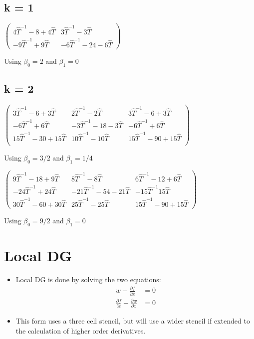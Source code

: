\documentclass[10pt,letterpaper]{article}
\begin{document}
\subsection{k = 1}
$\left(\begin{array}{cc}
4\hat{T}^{-1} -8+4 \hat{T} & 3\hat{T}^{-1}-3 \hat{T} \\
-9 \hat{T}^{-1} +9 \hat{T} & -6 \hat{T}^{-1} -24-6 \hat{T}
\end{array}\right)$

Using $\beta_0 = 2$ and $\beta_1 = 0$
    
\subsection{k = 2}
$\left(
\begin{array}{ccc}
 3 \hat{T}^{-1}-6+3 \hat{T} & 2 \hat{T}^{-1}-2 \hat{T} & 3 \hat{T}^{-1}-6+3 \hat{T} \\
 -6 \hat{T}^{-1}+6 \hat{T} & -3 \hat{T}^{-1}-18-3 \hat{T} & -6 \hat{T}^{-1}+6 \hat{T} \\
 15 \hat{T}^{-1}-30+15 \hat{T} & 10 \hat{T}^{-1}-10 \hat{T} & 15 \hat{T}^{-1}-90+15 \hat{T} \\
\end{array}
\right)$

Using $\beta_0 = 3/2$ and $\beta_1 = 1/4$

$\left(
\begin{array}{ccc}
 9 \hat{T}^{-1}-18+9 \hat{T} & 8 \hat{T}^{-1} -8 \hat{T}& 6 \hat{T}^{-1}-12+6 \hat{T} \\
 -24 \hat{T}^{-1}+24 \hat{T} & -21 \hat{T}^{-1}-54-21 \hat{T} & -15 \hat{T}^{-1}15 \hat{T} \\
 30 \hat{T}^{-1}-60+30 \hat{T} & 25 \hat{T}^{-1}-25 \hat{T} & 15 \hat{T}^{-1}-90+15 \hat{T}
\end{array}
\right)$

Using $\beta_0 = 9/2$ and $\beta_1 = 0$

\section{Local DG}
\begin{itemize}
\item Local DG is done by solving the two equations:
\begin{align*}
w + \frac{\partial f}{\partial x} &= 0\\
\frac{\partial f}{\partial t} + \frac{\partial w}{\partial x} &= 0
\end{align*}
\item This form uses a three cell stencil, but will use a wider stencil if extended to the calculation of higher order derivatives.
\end{itemize}
\end{document}
